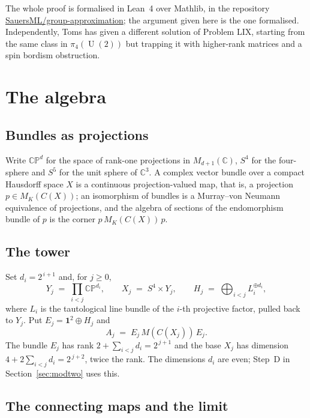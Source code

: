 \documentclass[11pt]{amsart}
\theoremstyle{plain}
\theoremstyle{definition}
\newcommand{\C}{\mathbb C}
\newcommand{\CP}{\mathbb{CP}}
\newcommand{\U}{\operatorname{U}}
\begin{document}
The whole proof is formalised in Lean~4 over Mathlib, in the repository
\href{https://github.com/SauersML/group-approximation}{SauersML/group-approximation};
the argument given here is the one formalised.  Independently, Toms \cite{To}
has given a different solution of Problem LIX, starting from the same class in
$\pi_4(\U(2))$ but trapping it with higher-rank matrices and a spin bordism
obstruction.

\section{The algebra}
\label{sec:algebra}

\subsection{Bundles as projections}

Write $\CP^d$ for the space of rank-one projections in $M_{d+1}(\C)$, $S^4$
for the four-sphere and $S^5$ for the unit sphere of $\C^3$.  A complex vector
bundle over a compact Hausdorff space $X$ is a continuous projection-valued
map, that is, a projection $p \in M_K(C(X))$; an isomorphism of bundles is a
Murray--von Neumann equivalence of projections, and the algebra of sections of
the endomorphism bundle of $p$ is the corner $p\, M_K(C(X))\, p$.

\subsection{The tower}

Set $d_i = 2^{\,i+1}$ and, for $j \geq 0$,
\[
  Y_j \;=\; \prod_{i<j} \CP^{d_i},
  \qquad
  X_j \;=\; S^4 \times Y_j,
  \qquad
  H_j \;=\; \bigoplus_{i<j} L_i^{\oplus d_i},
\]
where $L_i$ is the tautological line bundle of the $i$-th projective factor,
pulled back to $Y_j$.  Put $E_j = \mathbf 1^2 \oplus H_j$ and
\[
  A_j \;=\; E_j \, M(C(X_j)) \, E_j .
\]
The bundle $E_j$ has rank $2 + \sum_{i<j} d_i = 2^{\,j+1}$ and the base $X_j$
has dimension $4 + 2\sum_{i<j} d_i = 2^{\,j+2}$, twice the rank.  The
dimensions $d_i$ are even; Step~D in Section~\ref{sec:modtwo} uses this.

\subsection{The connecting maps and the limit}
\end{document}
